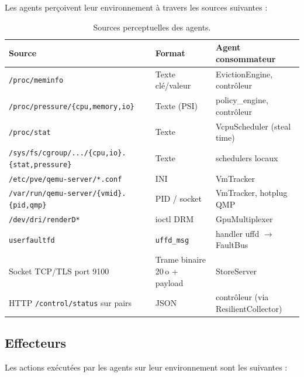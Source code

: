 Les agents perçoivent leur environnement à travers les sources suivantes :

\begin{table}[H]
\centering
\small
\caption{Sources perceptuelles des agents.}
\begin{tabular}{lll}
\toprule
\textbf{Source} & \textbf{Format} & \textbf{Agent consommateur} \\
\midrule
\texttt{/proc/meminfo}            & Texte clé/valeur     & EvictionEngine, contrôleur \\
\texttt{/proc/pressure/\{cpu,memory,io\}} & Texte (PSI)  & policy\_engine, contrôleur \\
\texttt{/proc/stat}               & Texte               & VcpuScheduler (steal time) \\
\texttt{/sys/fs/cgroup/.../\{cpu,io\}.\{stat,pressure\}} & Texte & schedulers locaux \\
\texttt{/etc/pve/qemu-server/*.conf} & INI              & VmTracker \\
\texttt{/var/run/qemu-server/\{vmid\}.\{pid,qmp\}} & PID / socket & VmTracker, hotplug QMP \\
\texttt{/dev/dri/renderD*}        & ioctl DRM          & GpuMultiplexer \\
\texttt{userfaultfd}              & \texttt{uffd\_msg} & handler uffd $\to$ FaultBus \\
Socket TCP/TLS port 9100          & Trame binaire 20\,o + payload & StoreServer \\
HTTP \texttt{/control/status} sur pairs & JSON          & contrôleur (via ResilientCollector) \\
\bottomrule
\end{tabular}

\label{tab:perceptions}
\end{table}

\subsection{Effecteurs}

Les actions exécutées par les agents sur leur environnement sont les suivantes :


